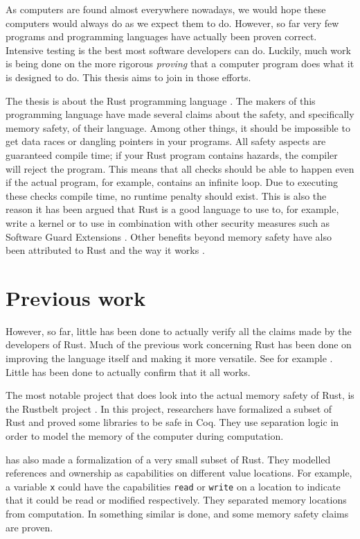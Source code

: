 As computers are found almost everywhere nowadays, we would hope these computers would always do as we expect them to do. However, so far very few programs and programming languages have actually been proven correct. Intensive testing is the best most software developers can do. Luckily, much work is being done on the more rigorous \emph{proving} that a computer program does what it is designed to do. This thesis aims to join in those efforts. 

The thesis is about the Rust programming language \citep{matsakis2014rust}. The makers of this programming language have made several claims about the safety, and specifically memory safety, of their language. Among other things, it should be impossible to get data races or dangling pointers in your programs. All safety aspects are guaranteed compile time; if your Rust program contains hazards, the compiler will reject the program. This means that all checks should be able to happen even if the actual program, for example, contains an infinite loop. Due to executing these checks compile time, no runtime penalty should exist. This is also the reason it has been argued that Rust is a good language to use to, for example, write a kernel \citep{levy2017kernel} or to use in combination with other security measures such as Software Guard Extensions \citep{ding2017sgx}. Other benefits beyond memory safety have also been attributed to Rust and the way it works \citep{balasubramanian2017system}.

\section{Previous work}
However, so far, little has been done to actually verify all the claims made by the developers of Rust. Much of the previous work concerning Rust has been done on improving the language itself and making it more versatile. See for example \cite{jespersen2015session}. Little has been done to actually confirm that it all works. 

The most notable project that does look into the actual memory safety of Rust, is the Rustbelt project \citep{jung2017rustbelt}. In this project, researchers have formalized a subset of Rust and proved some libraries to be safe in Coq. They use separation logic in order to model the memory of the computer during computation. 

\cite{benitez2016rusty} has also made a formalization of a very small subset of Rust. They modelled references and ownership as capabilities on different value locations. For example, a variable \verb|x| could have the capabilities \texttt{read} or \texttt{write} on a location to indicate that it could be read or modified respectively. They separated memory locations from computation. In \cite{reed2015patina} something similar is done, and some memory safety claims are proven. 

